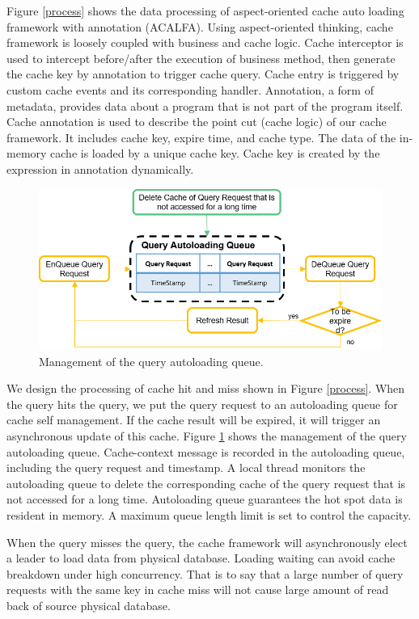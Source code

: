 \documentclass{singlecol-new}
\theoremstyle{TH}{
\newtheorem{lemma}{Lemma}
\newtheorem{theorem}[lemma]{Theorem}
\newtheorem{corrolary}[lemma]{Corrolary}
\newtheorem{conjecture}[lemma]{Conjecture}
\newtheorem{proposition}[lemma]{Proposition}
\newtheorem{claim}[lemma]{Claim}
\newtheorem{stheorem}[lemma]{Wrong Theorem}
}
\theoremstyle{THrm}{
\newtheorem{definition}{Definition}[section]
\newtheorem{question}{Question}[section]
\newtheorem{remark}{Remark}
\newtheorem{scheme}{Scheme}
}
\theoremstyle{THhit}{
\newtheorem{case}{Case}[section]
}
\begin{document}
Figure \ref{process} shows the data processing of aspect-oriented cache auto loading framework with annotation (ACALFA). Using aspect-oriented thinking, cache framework is loosely coupled with business and cache logic. Cache interceptor is used to intercept before/after the execution of business method, then generate the cache key by annotation to trigger cache query. Cache entry is triggered by custom cache events and its corresponding handler. Annotation, a form of metadata, provides data about a program that is not part of the program itself. Cache annotation is used to describe the point cut (cache logic) of our cache framework. It includes cache key, expire time, and cache type. The data of the in-memory cache is loaded by a unique cache key. Cache key is created by the expression in annotation dynamically.

\begin{figure} [htb]
\centering
\includegraphics[width=1.0\linewidth]{img/autoloading}
\caption{\label{autoloading}Management of the query autoloading queue.}
\end{figure}

We design the processing of cache hit and miss shown in Figure \ref{process}. When the query hits the query, we put the query request to an autoloading queue for cache self management. If the cache result will be expired, it will trigger an asynchronous update of this cache. Figure \ref{autoloading} shows the management of the query autoloading queue. Cache-context message is recorded in the autoloading queue, including the query request and timestamp. A local thread monitors the autoloading queue to delete the corresponding cache of the query request that is not accessed for a long time. Autoloading queue guarantees the hot spot data is resident in memory. A maximum queue length limit is set to control the capacity.

When the query misses the query, the cache framework will asynchronously elect a leader to load data from physical database. Loading waiting can avoid cache breakdown under high concurrency. That is to say that a large number of query requests with the same key in cache miss will not cause large amount of read back of source physical database.
\end{document}
